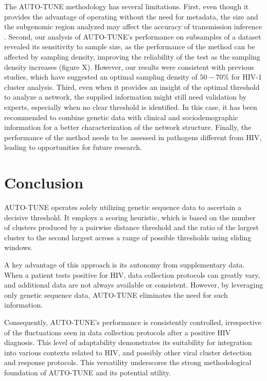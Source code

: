 \documentclass[utf8]{FrontiersinHarvard} %
\begin{document}
The AUTO-TUNE methodology has several limitations. First, even though it
provides the advantage of operating without the need for metadata, the size and
the subgenomic region analyzed may affect the accuracy of transmission
inference \citep{junqueira_factors_2019}. Second, our analysis of AUTO-TUNE's
performance on subsamples of a dataset revealed its sensitivity to sample size,
as the performance of the method can be affected by sampling density, improving
the reliability of the test as the sampling density increases (figure X).
However, our results were consistent with previous studies, which have
suggested an optimal sampling density of $50-70\%$ for HIV-1 cluster
analysis\citep{novitsky_impact_2014}. Third, even when it provides an insight of
the optimal threshold to analyze a network, the supplied information might
still need validation by experts, especially when no clear threshold is
identified. In this case, it has been recommended to combine genetic data with
clinical and sociodemographic information for a better characterization of the
network structure. Finally, the performance of the method needs to be assessed
in pathogens different from HIV, leading to opportunities for future research.

\section{Conclusion}

AUTO-TUNE operates solely utilizing genetic sequence data to ascertain a
decisive threshold. It employs a scoring heuristic, which is based on the
number of clusters produced by a pairwise distance threshold and the ratio of
the largest cluster to the second largest across a range of possible thresholds
using sliding windows.

A key advantage of this approach is its autonomy from supplementary data. When
a patient tests positive for HIV, data collection protocols can greatly vary,
and additional data are not always available or consistent. However, by
leveraging only genetic sequence data, AUTO-TUNE eliminates the need for such
information.

Consequently, AUTO-TUNE's performance is consistently controlled, irrespective
of the fluctuations seen in data collection protocols after a positive HIV
diagnosis. This level of adaptability demonstrates its suitability for
integration into various contexts related to HIV, and possibly other viral
cluster detection and response protocols. This versatility underscores the
strong methodological foundation of AUTO-TUNE and its potential utility.
\end{document}
